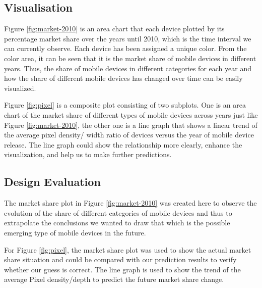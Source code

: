 \documentclass[conference]{IEEEtran}
\begin{document}

\subsection{Visualisation}
Figure \ref{fig:market-2010} is an area chart that each device plotted by its percentage market share over the years until 2010, which is the time interval we can currently observe. Each device has been assigned a unique color. From the color area, it can be seen that it is the market share of mobile devices in different years. Thus, the share of mobile devices in different categories for each year and how the share of different mobile devices has changed over time can be easily visualized.

Figure \ref{fig:pixel} is a composite plot consisting of two subplots. One is an area chart of the market share of different types of mobile devices across years just like Figure \ref{fig:market-2010}, the other one is a line graph that shows a linear trend of the average pixel density/ width ratio of devices versus the year of mobile device release. The line graph could show the relationship more clearly, enhance the visualization, and help us to make further predictions.

\subsection{Design Evaluation}
The market share plot in Figure \ref{fig:market-2010} was created here to observe the evolution of the share of different categories of mobile devices and thus to extrapolate the conclusions we wanted to draw that which is the possible emerging type of mobile devices in the future.

For Figure \ref{fig:pixel}, the market share plot was used to show the actual market share situation and could be compared with our prediction results to verify whether our guess is correct. The line graph is used to show the trend of the average Pixel density/depth to predict the future market share change.
\end{document}
